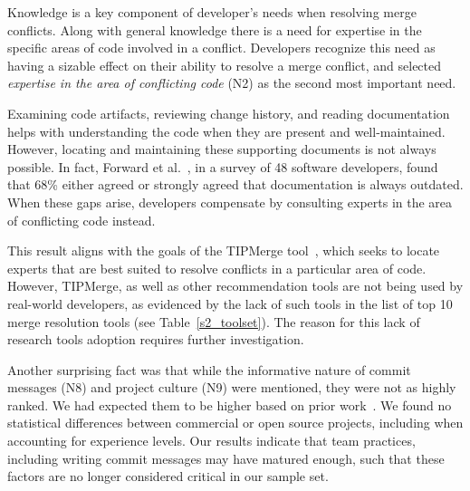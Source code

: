 Knowledge is a key component of developer's needs when resolving merge conflicts.
Along with general knowledge there is a need for expertise in the specific areas of code involved in a conflict.
Developers recognize this need as having a sizable effect on their ability to resolve a merge conflict, and selected \textit{expertise in the area of conflicting code} (N2) as the second most important need.

Examining code artifacts, reviewing change history, and reading documentation helps with understanding the code when they are present and well-maintained.
However, locating and maintaining these supporting documents is not always possible.
In fact, Forward et al.~\cite{forward2002documentation}, in a survey of 48 software developers, found that 68\% either agreed or strongly agreed that documentation is always outdated.
When these gaps arise, developers compensate by consulting experts in the area of conflicting code instead.

This result aligns with the goals of the TIPMerge tool~\cite{CostaSarma}, which seeks to locate experts that are best suited to resolve conflicts in a particular area of code.
However, TIPMerge, as well as other recommendation tools are not being used by real-world developers, as evidenced by the lack of such tools in the list of top 10 merge resolution tools (see Table~\ref{s2_toolset}).
The reason for this lack of research tools adoption requires further investigation.

Another surprising fact was that while the informative nature of commit messages (N8) and project culture (N9) were mentioned, they were not as highly ranked. %
We had expected them to be higher based on prior work~\cite{yamauchi2014clustering, hindle2009automatic, cortes2014automatically, hattori2008nature}. 
We found no statistical differences between commercial or open source projects, including when accounting for experience levels.
Our results indicate that team practices, including writing commit messages may have matured enough, such that these factors are no longer considered critical in our sample set. 


